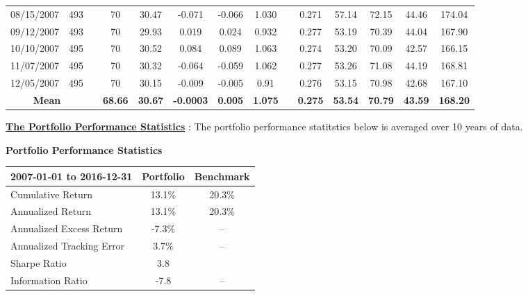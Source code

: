\documentclass[11pt]{article}
\begin{document}
\begin{table}[]
{\begin{tabular}{cccccccccccccc}
			08/15/2007 & 493 &  & 70 & 30.47 & -0.071 & -0.066 & 1.030 &  & 0.271 & 57.14 & 72.15 & 44.46 & 174.04 \\
			09/12/2007 & 493 &  & 70 & 29.93 & 0.019 & 0.024 & 0.932 &  & 0.277 & 53.19 & 70.39 & 44.04 & 167.90 \\
			10/10/2007 & 495 & \multicolumn{1}{l}{} & 70 & 30.52 & 0.084 & 0.089 & 1.063 & \multicolumn{1}{l}{} & 0.274 & 53.20 & 70.09 & 42.57 & 166.15 \\
			11/07/2007 & 495 & \multicolumn{1}{l}{} & 70 & 30.32 & -0.064 & -0.059 & 1.062 & \multicolumn{1}{l}{} & 0.277 & 53.26 & 71.08 & 44.19 & 168.81 \\
			12/05/2007 & 495 & \multicolumn{1}{l}{} & 70 & 30.15 & -0.009 & -0.005 & 0.91 & \multicolumn{1}{l}{} & 0.276 & 53.15 & 70.98 & 42.68 & 167.10 \\
			\cline{1-2} \cline{4-8} \cline{10-14} 
			\multicolumn{2}{c}{\textbf{Mean}} & \multicolumn{1}{l}{} & \textbf{68.66} & \textbf{30.67} & \textbf{-0.0003} & \textbf{0.005} & \textbf{1.075} & \multicolumn{1}{l}{} & \textbf{0.275} & \textbf{53.54} & \textbf{70.79} & \textbf{43.59} & \textbf{168.20} \\
			\bottomrule
		\end{tabular}%
	}
\end{table}

\underline{\textbf{The Portfolio Performance Statistics}} :  The portfolio performance statitstics below is averaged over 10 years of data.
\begin{center}
	\textbf{Portfolio Performance Statistics}\vspace*{-14pt}
\end{center}

\begin{table}[htbp]
	\def\arraystretch{1.4}
	\begin{center}
		\begin{tabular}{|l|c|c|}
			\hline
			\textbf{2007-01-01 to 2016-12-31}& 
			\textbf{Portfolio}& 
			\textbf{Benchmark} \\
			\hline
			Cumulative Return& 
			{13.1\%}& 
			{20.3\%} \\
			\hline
			Annualized Return& 
			{13.1\%}& 
			{20.3\%} \\
			\hline
			Annualized Excess Return& 
			{-7.3\%}& 
			-- \\
			\hline
			Annualized Tracking Error& 
			{3.7\%}& 
			-- \\
			\hline
			Sharpe Ratio& 
			3.8& 
			\\
			\hline
			Information Ratio& 
			-7.8& 
			-- \\
			\hline
		\end{tabular}
		\label{tab1}
	\end{center}
\end{table}
\end{document}
